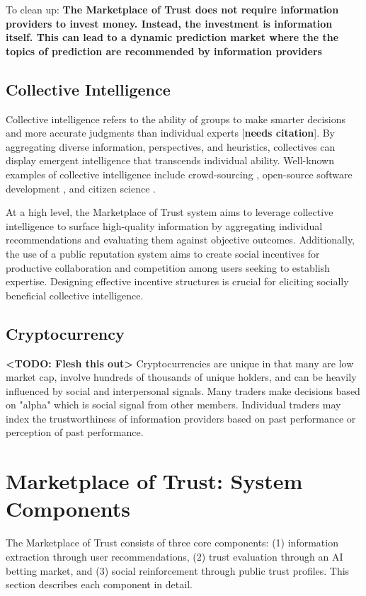 \documentclass{article}
\begin{document}
To clean up:
\textbf{The Marketplace of Trust does not require information providers to invest money. Instead, the investment is information itself. This can lead to a dynamic prediction market where the the topics of prediction are recommended by information providers}

\subsection{Collective Intelligence}  
Collective intelligence refers to the ability of groups to make smarter decisions and more accurate judgments than individual experts [\textbf{needs citation}]. By aggregating diverse information, perspectives, and heuristics, collectives can display emergent intelligence that transcends individual ability. Well-known examples of collective intelligence include crowd-sourcing \cite{CROWDsulin} \cite{IncentiveCrowdsourcing}, open-source software development \cite{CI_OS_Stiles}, and citizen science \cite{CitizenSciencePrest}.

At a high level, the Marketplace of Trust system aims to leverage collective intelligence to surface high-quality information by aggregating individual recommendations and evaluating them against objective outcomes. Additionally, the use of a public reputation system aims to create social incentives for productive collaboration and competition among users seeking to establish expertise. Designing effective incentive structures is crucial for eliciting socially beneficial collective intelligence.

\subsection{Cryptocurrency}
\textbf{<TODO: Flesh this out>}
Cryptocurrencies are unique in that many are low market cap, involve hundreds of thousands of unique holders, and can be heavily influenced by social and interpersonal signals. Many traders make decisions based on "alpha" which is social signal from other members. Individual traders may index the trustworthiness of information providers based on past performance or perception of past performance.

\section{Marketplace of Trust: System Components}

The Marketplace of Trust consists of three core components: (1) information extraction through user recommendations, (2) trust evaluation through an AI betting market, and (3) social reinforcement through public trust profiles. This section describes each component in detail.
\end{document}
